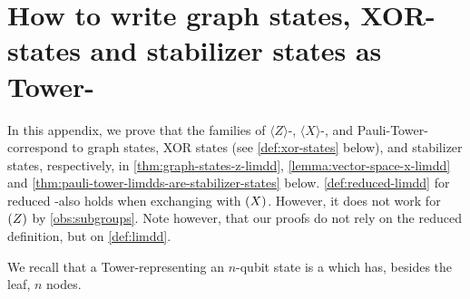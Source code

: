 \section{How to write graph states, XOR-states and stabilizer states as Tower-\limdds}
\label{sec:graph-states-limdds}
\label{sec:proof-stabilizer-states-tower-limdds}

In this appendix, we prove that the families of $\langle Z\rangle$-, 
$\langle X\rangle$-, and Pauli-Tower-\limdds correspond to graph states, XOR states (see \autoref{def:xor-states} below), and stabilizer states, respectively, in \autoref{thm:graph-states-z-limdd}, \autoref{lemma:vector-space-x-limdd} and \autoref{thm:pauli-tower-limdds-are-stabilizer-states} below.
\autoref{def:reduced-limdd} for reduced \Pauli-\limdds also holds when exchanging \Pauli{} with $\left(X\right)$. However, it does not work for $\left(Z\right)$ by \ref{obs:subgroups}. Note however, that our proofs do not rely on the reduced definition, but on \autoref{def:limdd}.


We recall that a Tower-\limdd representing an $n$-qubit state is a \limdd which has, besides the leaf, $n$ nodes.


